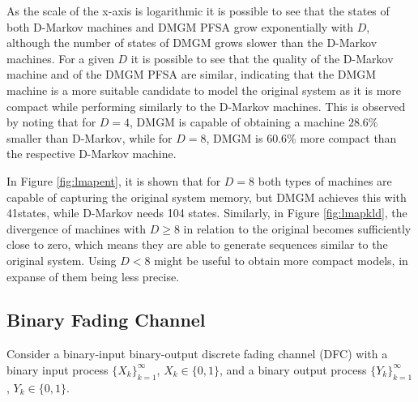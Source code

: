 {As the scale of the x-axis is logarithmic it is possible to see that the states of both D-Markov machines and DMGM PFSA grow exponentially with $D$, although the number of states of DMGM grows slower than the D-Markov machines. For a given $D$ it is possible to see that the quality of the D-Markov machine and of the DMGM PFSA are similar, indicating that the DMGM machine is a more suitable candidate to model the original system as it is more compact while performing similarly to the D-Markov machines.  This is observed by noting that for $D = 4$, DMGM is capable of obtaining a machine $28.6\%$ smaller than D-Markov, while for $D = 8$, DMGM is $60.6\%$ more compact than the respective D-Markov machine. 


In Figure \ref{fig:lmapent}, it is shown that for $D = 8$ both types of machines are capable of capturing the original system memory, but DMGM achieves this with 41states, while D-Markov needs 104 states. Similarly, in Figure \ref{fig:lmapkld}, the divergence of machines with $D \geq 8$ in relation to the original becomes sufficiently close to zero, which means they are able to generate sequences similar to the original system. Using $D < 8$ might be useful to obtain more compact models, in expanse of them being less precise. 



\FloatBarrier
\subsection{Binary Fading Channel}

Consider a binary-input binary-output discrete fading channel (DFC) with a binary input process $\{X_k\}_{k=1}^{\infty}$, $X_k \in \{0,1\}$, 
and a binary output process $\{Y_k\}_{k=1}^{\infty}$,  $Y_k \in \{0,1\}$.

}
